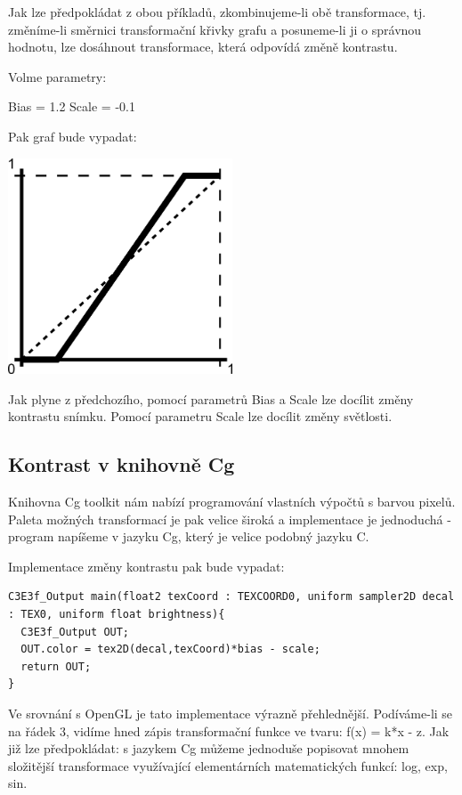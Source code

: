 Jak lze předpokládat z obou příkladů, zkombinujeme-li obě transformace, tj. změníme-li směrnici transformační křivky grafu a posuneme-li ji o správnou hodnotu, lze dosáhnout transformace, která odpovídá změně kontrastu.

Volme parametry:

Bias = 1.2
Scale = -0.1

Pak graf bude vypadat:

\begin{center}
\includegraphics[width=0.5\textwidth]{Text/IMG/BiasScale.png}
\end{center}

Jak plyne z předchozího, pomocí parametrů Bias a Scale lze docílit změny kontrastu snímku. Pomocí parametru Scale lze docílit změny světlosti.

\subsection{Kontrast v knihovně Cg}
Knihovna Cg toolkit nám nabízí programování vlastních výpočtů s barvou pixelů. Paleta možných transformací je pak velice široká a implementace je jednoduchá - program napíšeme v jazyku Cg, který je velice podobný jazyku C.

Implementace změny kontrastu pak bude vypadat:
\begin{lstlisting}[label=DicomImageClass,caption={...}]
C3E3f_Output main(float2 texCoord : TEXCOORD0, uniform sampler2D decal : TEX0, uniform float brightness){
  C3E3f_Output OUT;
  OUT.color = tex2D(decal,texCoord)*bias - scale;
  return OUT;
}
\end{lstlisting}

Ve srovnání s OpenGL je tato implementace výrazně přehlednější. Podíváme-li se na řádek 3, vidíme hned zápis transformační funkce ve tvaru: f(x) = k*x - z. Jak již lze předpokládat: s jazykem Cg můžeme jednoduše popisovat mnohem složitější transformace využívající elementárních matematických funkcí: log, exp, sin.




